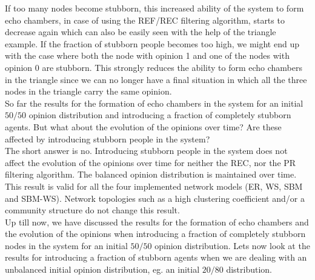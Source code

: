 \documentclass[11 pt , letterpaper , twoside , openright]{book}
\begin{document}
If too many nodes become stubborn, this increased ability of the system to form echo chambers, in case of using the REF/REC filtering algorithm, starts to decrease again which can also be easily seen with the help of the triangle example. If the fraction of stubborn people becomes too high, we might end up with the case where both the node with opinion 1 and one of the nodes with opinion 0 are stubborn. This strongly reduces the ability to form echo chambers in the triangle since we can no longer have a final situation in which all the three nodes in the triangle carry the same opinion.\\
\newline
So far the results for the formation of echo chambers in the system for an initial $50/50$ opinion distribution and introducing a fraction of completely stubborn agents. But what about the evolution of the opinions over time? Are these affected by introducing stubborn people in the system? \\
The short answer is no. Introducing stubborn people in the system does not affect the evolution of the opinions over time for neither the REC, nor the PR filtering algorithm. The balanced opinion distribution is maintained over time. This result is valid for all the four implemented network models (ER, WS, SBM and SBM-WS). Network topologies such as a high clustering coefficient and/or a community structure do not change this result. \\%
\newline
Up till now, we have discussed the results for the formation of echo chambers and the evolution of the opinions when introducing a fraction of completely stubborn nodes in the system for an initial $50/50$ opinion distribution. Lets now look at the results for introducing a fraction of stubborn agents when we are dealing with an unbalanced initial opinion distribution, eg. an initial $20/80$ distribution.\\
\newline
\end{document}
